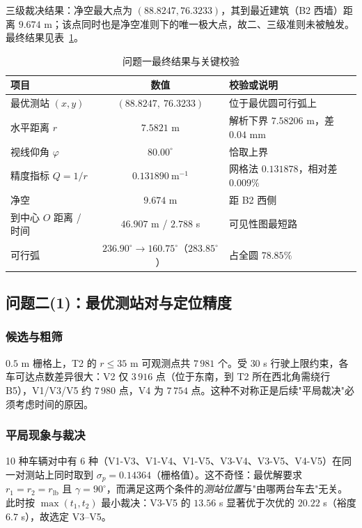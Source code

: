 \documentclass[UTF8,a4paper,zihao=-4,oneside]{ctexart}
\begin{document}
三级裁决结果：净空最大点为 $(88.8247,76.3233)$，其到最近建筑（B2 西墙）距离 $9.674$ m；该点同时也是净空准则下的唯一极大点，故二、三级准则未被触发。最终结果见表~\ref{tab:q1res}。

\begin{table}[htbp]
  \centering
  \caption{问题一最终结果与关键校验}
  \label{tab:q1res}
  \small
  \begin{tabular}{lc|l}
    \toprule
    项目 & 数值 & 校验或说明 \\
    \midrule
    最优测站 $(x,y)$ & $(88.8247,\ 76.3233)$ & 位于最优圆可行弧上 \\
    水平距离 $r$ & $7.5821$ m & 解析下界 $7.58206$ m，差 $0.04$ mm \\
    视线仰角 $\varphi$ & $80.00^\circ$ & 恰取上界 \\
    精度指标 $Q=1/r$ & $0.131890\ \mathrm{m^{-1}}$ & 网格法 $0.131878$，相对差 $0.009\%$ \\
    净空 & $9.674$ m & 距 B2 西侧 \\
    到中心 $O$ 距离 / 时间 & $46.907$ m / $2.788$ s & 可见性图最短路 \\
    可行弧 & $236.90^\circ\to160.75^\circ$（$283.85^\circ$） & 占全圆 $78.85\%$ \\
    \bottomrule
  \end{tabular}
\end{table}

\subsection{问题二(1)：最优测站对与定位精度}

\subsubsection{候选与粗筛}

$0.5$ m 栅格上，T2 的 $r\le35$ m 可观测点共 $7\,981$ 个。受 $30$ s 行驶上限约束，各车可达点数差异很大：V2 仅 $3\,916$ 点（位于东南，到 T2 所在西北角需绕行 B5），V1/V3/V5 约 $7\,980$ 点，V4 为 $7\,754$ 点。这种不对称正是后续"平局裁决"必须考虑时间的原因。

\subsubsection{平局现象与裁决}

10 种车辆对中有 6 种（V1-V3、V1-V4、V1-V5、V3-V4、V3-V5、V4-V5）在同一对测站上同时取到 $\sigma_p=0.14364$（栅格值）。这不奇怪：最优解要求 $r_1=r_2=r_{\mathrm{lb}}$ 且 $\gamma=90^\circ$，而满足这两个条件的\emph{测站位置}与"由哪两台车去"无关。此时按 $\max(t_1,t_2)$ 最小裁决：V3-V5 的 $13.56$ s 显著优于次优的 $20.22$ s（裕度 $6.7$ s），故选定 V3–V5。
\end{document}
